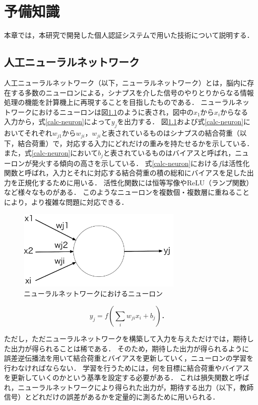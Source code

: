 \chapter{予備知識}
本章では，本研究で開発した個人認証システムで用いた技術について説明する．

\section{人工ニューラルネットワーク}
人工ニューラルネットワーク（以下，ニューラルネットワーク）とは，脳内に存在する多数のニューロンによる，シナプスを介した信号のやりとりからなる情報処理の機能を計算機上に再現することを目指したものである．
ニューラルネットワークにおけるニューロンは図\ref{neuron}のように表され，図中の$x_1$から$x_i$からなる入力から，式\ref{calc-neuron}によって$y_j$を出力する．
図\ref{neuron}および式\ref{calc-neuron}においてそれぞれ$w_{j1}$から$w_{ji}$，$w_{ji}$と表されているものはシナプスの結合荷重（以下，結合荷重）で，対応する入力にどれだけの重みを持たせるかを示している．
また，式\ref{calc-neuron}において$b_j$と表されているものはバイアスと呼ばれ，ニューロンが発火する傾向の高さを示している．
式\ref{calc-neuron}における$f$は活性化関数と呼ばれ，入力とそれに対応する結合荷重の積の総和にバイアスを足した出力を正規化するために用いる．
活性化関数には恒等写像やReLU（ランプ関数）など様々なものがある．
このようなニューロンを複数個・複数層に重ねることにより，より複雑な問題に対応できる．

\begin{figure}[hbtp]
  \centering
  \includegraphics[bb=0 0 683 330, width=8cm]{Figures/neuron.pdf}
  \caption{ニューラルネットワークにおけるニューロン}
  \label{neuron}
\end{figure}

\begin{equation}
\label{calc-neuron}
y_j = f(\sum_i w_{ji} x_i + b_j)．
\end{equation}

ただし，ただニューラルネットワークを構築して入力を与えただけでは，期待した出力が得られることは稀である．
そのため，期待した出力が得られるように誤差逆伝播法を用いて結合荷重とバイアスを更新していく，ニューロンの学習を行わなければならない．
学習を行うためには，何を目標に結合荷重やバイアスを更新していくのかという基準を設定する必要がある．
これは損失関数と呼ばれ，ニューラルネットワークにより得られた出力が，期待する出力（以下，教師信号）とどれだけの誤差があるかを定量的に測るために用いられる．

